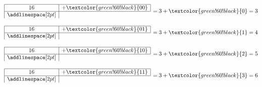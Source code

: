\newcommand{\colorA}[1]{\textcolor{green!60!black}{#1}}
\newcommand{\colorB}[1]{\textcolor{magenta!65!black}{#1}}
\newcommand{\colorC}[1]{\textcolor{cyan!60!black}{#1}}

\begin{minipage}[t]{\textwidth}
	\vspace{0pt}
	\newcommand{\codearray}[3]{
		$\begin{array}{|c|c|}
			\hline
			16 & +\colorA{#1} \\
			\hline
			\addlinespace[2pt]
		\end{array} \,= #2 = #3$
		
	}
	
	\codearray{00}{3 + \colorA{0}}{3}
	\codearray{01}{3 + \colorA{1}}{4}
	\codearray{10}{3 + \colorA{2}}{5}
	\codearray{11}{3 + \colorA{3}}{6}
\end{minipage}

\vspace{16pt}

